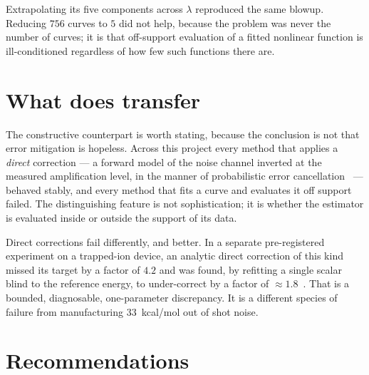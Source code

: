 \documentclass[aps,prx,twocolumn,superscriptaddress,nofootinbib,floatfix]{revtex4-2}
\begin{document}
Extrapolating its five components across $\lambda$ reproduced the same
blowup. Reducing $756$ curves to $5$ did not help, because the problem was
never the number of curves; it is that off-support evaluation of a fitted
nonlinear function is ill-conditioned regardless of how few such functions
there are.

\section{What does transfer}

The constructive counterpart is worth stating, because the conclusion is
not that error mitigation is hopeless. Across this project every method
that applies a \emph{direct} correction --- a forward model of the noise
channel inverted at the measured amplification level, in the manner of
probabilistic error
cancellation~\cite{temme2017,vandenberg2023} --- behaved stably, and every
method that fits a curve and evaluates it off support failed. The
distinguishing feature is not sophistication; it is whether the estimator
is evaluated inside or outside the support of its data.

Direct corrections fail differently, and better. In a separate
pre-registered experiment on a trapped-ion device, an analytic direct
correction of this kind missed its target by a factor of $4.2$ and was
found, by refitting a single scalar blind to the reference energy, to
under-correct by a factor of $\approx1.8$~\cite{companion}. That is a
bounded, diagnosable, one-parameter discrepancy. It is a different species
of failure from manufacturing $33$~kcal/mol out of shot noise.

\section{Recommendations}
\end{document}
